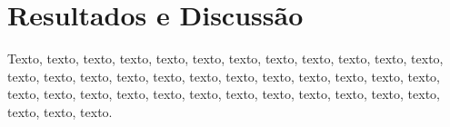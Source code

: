 \chapter{Resultados e Discussão}
Texto, texto, texto, texto, texto, texto, texto, texto, texto, texto, texto, texto, texto, texto, texto, texto, texto, texto, texto, texto, texto, texto, texto, texto, texto, texto, texto, texto, texto, texto, texto, texto, texto, texto, texto, texto, texto, texto, texto.